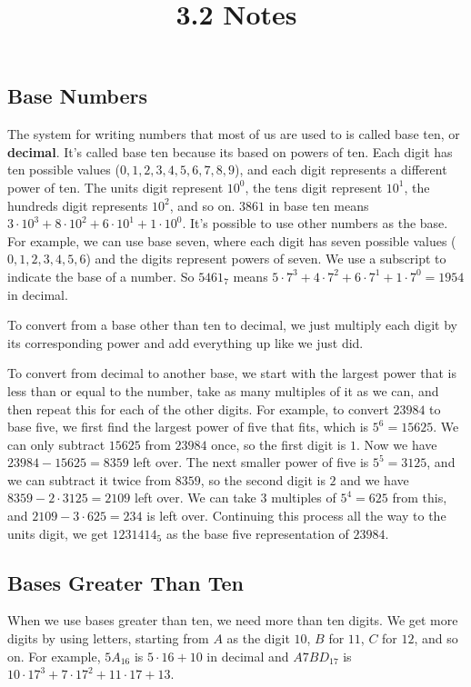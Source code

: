 \documentclass{article}
\title{3.2 Notes}
\author{}
\date{}
\begin{document}
\maketitle

\begin{multicols}{2}
	\section*{Base Numbers}
	The system for writing numbers that most of us are used to is called base ten, or \textbf{decimal}.
	It's called base ten because its based on powers of ten.
	Each digit has ten possible values ($0, 1, 2, 3, 4, 5, 6, 7, 8, 9$), and each digit represents a different power of ten.
	The units digit represent $10^0$, the tens digit represent $10^1$, the hundreds digit represents $10^2$, and so on.
	$3861$ in base ten means $3 \cdot 10^3 + 8 \cdot 10^2 + 6 \cdot 10^1 + 1 \cdot 10^0$.
	It's possible to use other numbers as the base.
	For example, we can use base seven, where each digit has seven possible values ($0, 1, 2, 3, 4, 5, 6$) and the digits represent powers of seven.
	We use a subscript to indicate the base of a number.
	So $5461_7$ means $5 \cdot 7^3 + 4 \cdot 7^2 + 6 \cdot 7^1 + 1 \cdot 7^0 = 1954$ in decimal.

	To convert from a base other than ten to decimal, we just multiply each digit by its corresponding power and add everything up like we just did.

	To convert from decimal to another base, we start with the largest power that is less than or equal to the number, take as many multiples of it as we can, and then repeat this for each of the other digits.
	For example, to convert $23984$ to base five, we first find the largest power of five that fits, which is $5^6 = 15625$.
	We can only subtract $15625$ from $23984$ once, so the first digit is $1$.
	Now we have $23984 - 15625 = 8359$ left over.
	The next smaller power of five is $5^5 = 3125$, and we can subtract it twice from $8359$, so the second digit is $2$ and we have $8359 - 2 \cdot 3125 = 2109$ left over.
	We can take $3$ multiples of $5^4 = 625$ from this, and $2109 - 3 \cdot 625 = 234$ is left over.
	Continuing this process all the way to the units digit, we get $1231414_5$ as the base five representation of $23984$.

	\subsection*{Bases Greater Than Ten}
	When we use bases greater than ten, we need more than ten digits.
	We get more digits by using letters, starting from $A$ as the digit $10$, $B$ for $11$, $C$ for $12$, and so on.
	For example, $5A_{16}$ is $5 \cdot 16 + 10$ in decimal and $A7BD_{17}$ is $10 \cdot 17^3 + 7 \cdot 17^2 + 11 \cdot 17 + 13$.


\end{multicols}
\end{document}
